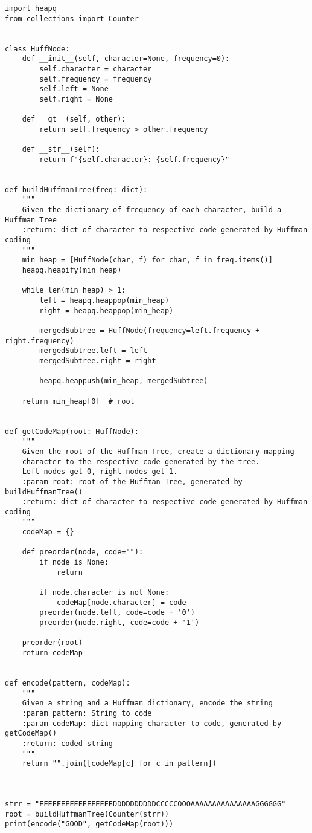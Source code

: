 \begin{verbatim}
import heapq
from collections import Counter


class HuffNode:
    def __init__(self, character=None, frequency=0):
        self.character = character
        self.frequency = frequency
        self.left = None
        self.right = None

    def __gt__(self, other):
        return self.frequency > other.frequency

    def __str__(self):
        return f"{self.character}: {self.frequency}"


def buildHuffmanTree(freq: dict):
    """
    Given the dictionary of frequency of each character, build a Huffman Tree
    :return: dict of character to respective code generated by Huffman coding
    """
    min_heap = [HuffNode(char, f) for char, f in freq.items()]
    heapq.heapify(min_heap)

    while len(min_heap) > 1:
        left = heapq.heappop(min_heap)
        right = heapq.heappop(min_heap)

        mergedSubtree = HuffNode(frequency=left.frequency + right.frequency)
        mergedSubtree.left = left
        mergedSubtree.right = right

        heapq.heappush(min_heap, mergedSubtree)

    return min_heap[0]  # root


def getCodeMap(root: HuffNode):
    """
    Given the root of the Huffman Tree, create a dictionary mapping
    character to the respective code generated by the tree.
    Left nodes get 0, right nodes get 1.
    :param root: root of the Huffman Tree, generated by buildHuffmanTree()
    :return: dict of character to respective code generated by Huffman coding
    """
    codeMap = {}

    def preorder(node, code=""):
        if node is None:
            return

        if node.character is not None:
            codeMap[node.character] = code
        preorder(node.left, code=code + '0')
        preorder(node.right, code=code + '1')

    preorder(root)
    return codeMap


def encode(pattern, codeMap):
    """
    Given a string and a Huffman dictionary, encode the string
    :param pattern: String to code
    :param codeMap: dict mapping character to code, generated by getCodeMap()
    :return: coded string
    """
    return "".join([codeMap[c] for c in pattern])



strr = "EEEEEEEEEEEEEEEEEDDDDDDDDDDCCCCCOOOAAAAAAAAAAAAAAAGGGGGG"
root = buildHuffmanTree(Counter(strr))
print(encode("GOOD", getCodeMap(root)))
\end{verbatim}

